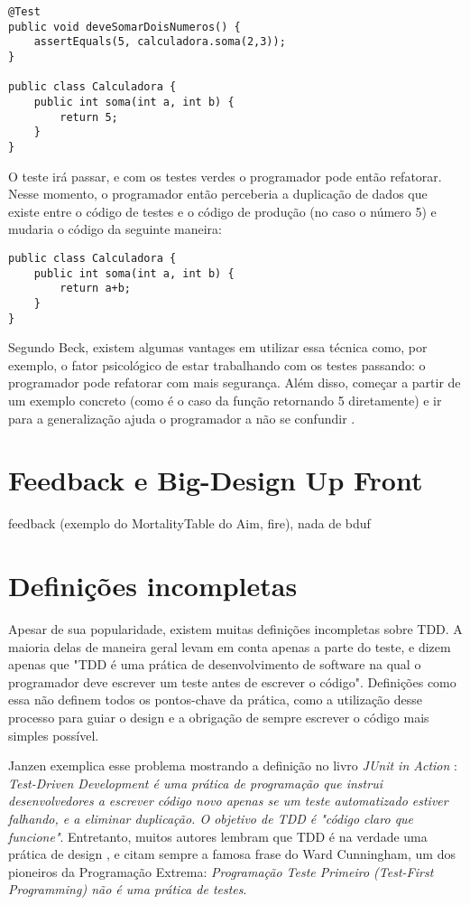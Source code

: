 \begin{lstlisting}[frame=trbl]
@Test
public void deveSomarDoisNumeros() {
	assertEquals(5, calculadora.soma(2,3));
}

public class Calculadora {
	public int soma(int a, int b) {
		return 5;
	}
}
\end{lstlisting}

O teste irá passar, e com os testes verdes o programador pode então refatorar. Nesse momento, o programador então
perceberia a duplicação de dados que existe entre o código de testes e o código de produção (no caso o número 5) e 
mudaria o código da seguinte maneira:

\begin{lstlisting}[frame=trbl]
public class Calculadora {
	public int soma(int a, int b) {
		return a+b;
	}
}
\end{lstlisting}

Segundo Beck, existem algumas vantages em utilizar essa técnica como, por exemplo, o fator psicológico de estar
trabalhando com os testes passando: o programador pode refatorar com mais segurança. Além disso, começar a partir
de um exemplo concreto (como é o caso da função retornando 5 diretamente) e ir para a generalização ajuda o programador
a não se confundir \cite{TDDByExample}.

\section{Feedback e Big-Design Up Front}

feedback (exemplo do MortalityTable do Aim, fire), nada de bduf

\section{Definições incompletas} 
\label{sec:tdd-definicoes-incompletas}

Apesar de sua popularidade, existem muitas definições incompletas sobre TDD. A maioria delas de maneira geral levam em conta
apenas a parte do teste, e dizem apenas
que "TDD é uma prática de desenvolvimento de software na qual o programador deve escrever um teste antes de escrever o código".
Definições como essa não definem todos os pontos-chave da prática, como a utilização desse processo para guiar o design e
a obrigação de sempre escrever o código mais simples possível.

Janzen \cite{tdd-taxonomy} exemplica esse problema mostrando a definição no livro \textit{JUnit in Action} \cite{junit-in-action}:
\textit{Test-Driven Development é uma prática de programação que instrui desenvolvedores a escrever código novo apenas se um teste
automatizado estiver falhando, e a eliminar duplicação. O objetivo de TDD é "código claro que funcione"}. 
Entretanto, muitos autores lembram que TDD é na verdade uma prática de design \cite{tdd-taxonomy} \cite{aim-fire}, 
e citam sempre a famosa frase do Ward Cunningham, um dos pioneiros da Programação Extrema:
\textit{Programação Teste Primeiro (Test-First Programming) não é uma prática de testes}. 

